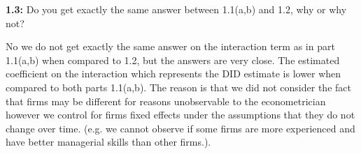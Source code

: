\documentclass[a4paper]{article}
\begin{document}
\noindent \textbf{1.3:} Do you get exactly the same answer between 1.1(a,b) and 1.2, why or why not?

No we do not get exactly the same answer on the interaction term as in part 1.1(a,b) when compared to 1.2, but the answers are very close. The estimated coefficient on the interaction which represents the DID estimate is lower when compared to both parts 1.1(a,b). The reason is that we did not consider the fact that firms may be different for reasons unobservable to the econometrician however we control for firms fixed effects under the assumptions that they do not change over time. (e.g. we cannot observe if some firms are more experienced and have better managerial skills than other firms.). 

\vspace{3cm}
\end{document}
